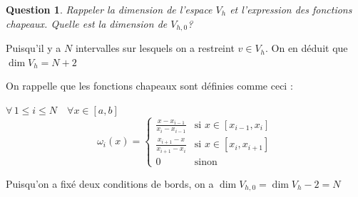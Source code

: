 \documentclass{article}
\newtheorem{question}{Question}[subsection]
\newenvironment{answer}
  {\color{blue}}
  {}
\newcommand{\QuestionAnswer}[2]{
    \begin{question}
        #1
    \end{question}
    \begin{answer}
        #2
    \end{answer}
}
\begin{document}
\QuestionAnswer{
    Rappeler la dimension de l'espace $V_h$ et l'expression des fonctions chapeaux. Quelle est la dimension de $V_{h,0}$?
}{
    
    Puisqu'il y a $N$ intervalles sur lesquels on a restreint $v \in V_h$. On en déduit que $\dim V_h = N + 2$\newline

    On rappelle que les fonctions chapeaux sont définies comme ceci :\newline

    $\forall \, 1 \leq i \leq N \quad \forall x \in [a,b]$
    \begin{equation*}
        \omega_i (x) = 
        \begin{cases} 
        \frac{x - x_{i-1}}{x_i - x_{i-1}} & \text{si } x \in [x_{i-1}, x_i] \\
        \frac{x_{i+1} - x}{x_{i+1} - x_i} & \text{si } x \in [x_i, x_{i+1}] \\
        0 & \text{sinon}
        \end{cases}
    \end{equation*}

    Puisqu'on a fixé deux conditions de bords, on a $\dim V_{h,0} = \dim V_h - 2 = N$
}
\end{document}

